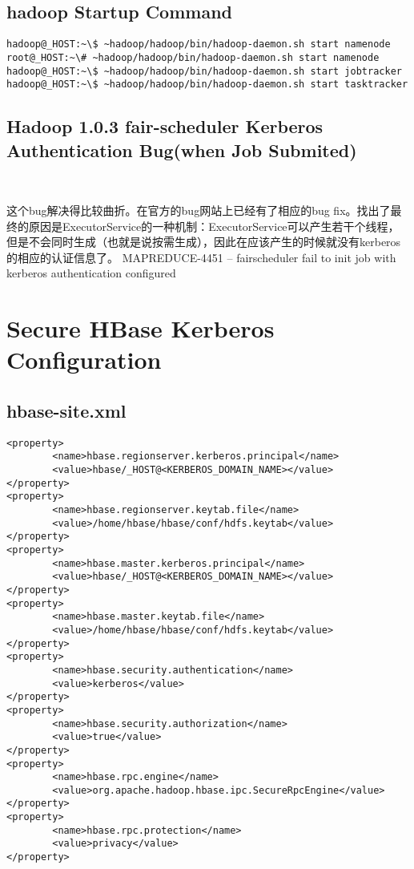 \documentclass[a4paper,12pt]{article}
\begin{document}
\begin{CJK}{UTF8}{gbsn}
\subsection{hadoop Startup Command}

\begin{verbatim}
hadoop@_HOST:~\$ ~hadoop/hadoop/bin/hadoop-daemon.sh start namenode
root@_HOST:~\# ~hadoop/hadoop/bin/hadoop-daemon.sh start namenode
hadoop@_HOST:~\$ ~hadoop/hadoop/bin/hadoop-daemon.sh start jobtracker
hadoop@_HOST:~\$ ~hadoop/hadoop/bin/hadoop-daemon.sh start tasktracker
\end{verbatim}

\subsection{Hadoop 1.0.3 fair-scheduler Kerberos Authentication Bug(when Job Submited)}　

这个bug解决得比较曲折。在官方的bug网站上已经有了相应的bug fix。找出了最终的原因是ExecutorService的一种机制：ExecutorService可以产生若干个线程，但是不会同时生成（也就是说按需生成），因此在应该产生的时候就没有kerberos的相应的认证信息了。
MAPREDUCE-4451 -- fairscheduler fail to init job with kerberos authentication configured
\section{Secure HBase Kerberos Configuration}

\subsection{hbase-site.xml}
\begin{verbatim}
<property>
        <name>hbase.regionserver.kerberos.principal</name>
        <value>hbase/_HOST@<KERBEROS_DOMAIN_NAME></value>
</property>
<property>
        <name>hbase.regionserver.keytab.file</name>
        <value>/home/hbase/hbase/conf/hdfs.keytab</value>
</property>
<property>
        <name>hbase.master.kerberos.principal</name>
        <value>hbase/_HOST@<KERBEROS_DOMAIN_NAME></value>
</property>
<property>
        <name>hbase.master.keytab.file</name>
        <value>/home/hbase/hbase/conf/hdfs.keytab</value>
</property>
<property>
        <name>hbase.security.authentication</name>
        <value>kerberos</value>
</property>
<property>
        <name>hbase.security.authorization</name>
        <value>true</value>
</property>
<property>
        <name>hbase.rpc.engine</name>
        <value>org.apache.hadoop.hbase.ipc.SecureRpcEngine</value>
</property>
<property>
        <name>hbase.rpc.protection</name>
        <value>privacy</value>
</property>
\end{verbatim}


\end{CJK}
\end{document}
